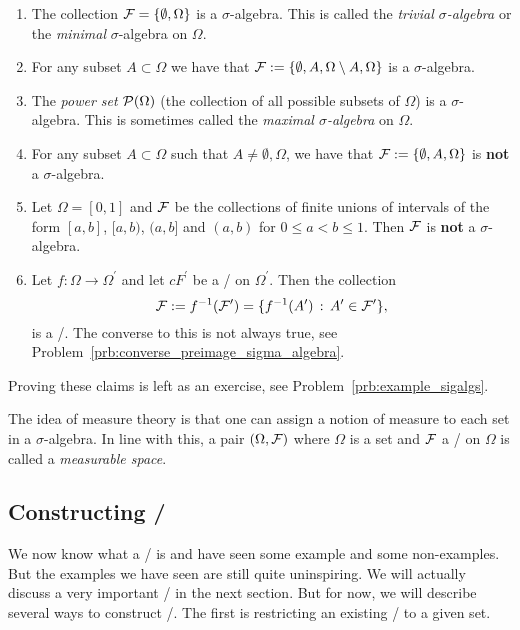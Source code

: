 \begin{example}\label{example:sigma_algebras}
\hfil
\begin{enumerate}
\item The collection $\mathcal F = \{\emptyset, \Omega\}$ is a $\sigma$-algebra. This is called the \emph{trivial $\sigma$-algebra} or the \emph{minimal} $\sigma$-algebra on $\Omega$.
\item For any subset $A \subset \Omega$ we have that $\mathcal F := \{\emptyset, A, \Omega\setminus A, \Omega\}$ is a $\sigma$-algebra.
\item The \emph{power set} $\mathcal P(\Omega)$ (the collection of all possible subsets of $\Omega$) is a $\sigma$-algebra. This is sometimes called the \emph{maximal $\sigma$-algebra} on $\Omega$.
\item For any subset $A \subset \Omega$ such that $A \ne \emptyset, \Omega$, we have that $\mathcal F := \{\emptyset, A, \Omega\}$ is \textbf{not} a $\sigma$-algebra.
\item Let $\Omega = [0,1]$ and $\mathcal F$ be the collections of finite unions of intervals of the form $[a,b]$, $[a,b)$, $(a,b]$ and $(a,b)$ for $0 \le a < b \le 1$. Then $\mathcal F$ is \textbf{not} a $\sigma$-algebra.
\item Let $f : \Omega \to \Omega^\prime$ and let $cF^\prime$ be a \sigalg/ on $\Omega^\prime$. Then the collection
\[
	\mathcal F := f^{-1}(\mathcal F^\prime) = \{f^{-1}(A^\prime) \, : \, A^\prime \in \mathcal F^\prime\},
\]
is a \sigalg/. The converse to this is not always true, see Problem~\ref{prb:converse_preimage_sigma_algebra}.
\end{enumerate}
\end{example}

Proving these claims is left as an exercise, see Problem~\ref{prb:example_sigalgs}.

The idea of measure theory is that one can assign a notion of measure to each set in a $\sigma$-algebra. In line with this, a pair $(\Omega, \mathcal F)$ where $\Omega$ is a set and $\mathcal F$ a \sigalg/ on $\Omega$ is called a \emph{measurable space}. 

\subsection{Constructing \sigalgs/}\label{ssec:construction_sigalgs}

We now know what a \sigalg/ is and have seen some example and some non-examples. But the examples we have seen are still quite uninspiring. We will actually discuss a very important \sigalg/ in the next section. But for now, we will describe several ways to construct \sigalgs/. The first is restricting an existing \sigalg/ to a given set.

